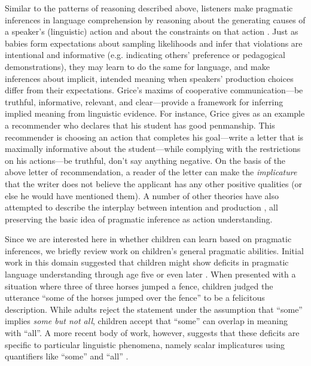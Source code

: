 \documentclass[man]{apa2}
\begin{document}

Similar to the patterns of reasoning described above, listeners make pragmatic inferences in language comprehension by reasoning about the generating causes of a speaker's (linguistic) action and about the constraints on that action \cite{shafto2012}. Just as babies form expectations about sampling likelihoods and infer that violations are intentional and informative (e.g. indicating others' preference or pedagogical demonstrations), they may learn to do the same for language, and make inferences about implicit, intended meaning when speakers' production choices differ from their expectations. Grice's \citeyear{grice1975} maxims of cooperative communication---be truthful, informative, relevant, and clear---provide a framework for inferring implied meaning from linguistic evidence. For instance, Grice gives as an example a recommender who declares that his student has good penmanship. This recommender is choosing an action that completes his goal---write a letter that is maximally informative about the student---while complying with the restrictions on his actions---be truthful, don't say anything negative. On the basis of the above letter of recommendation, a reader of the letter can make the \emph{implicature} that the writer does not believe the applicant has any other positive qualities (or else he would have mentioned them). A number of other theories have also attempted to describe the interplay between intention and production \cite{horn1984,sperber1986,clark1996,levinson2000}, all preserving the basic idea of pragmatic inference as action understanding. 

Since we are interested here in whether children can learn based on pragmatic inferences, we briefly review work on children's general pragmatic abilities. Initial work in this domain suggested that children might show deficits in pragmatic language understanding through age five or even later \cite{noveck2000,papafragou2003}. When presented with a situation where three of three horses jumped a fence, children judged the utterance ``some of the horses jumped over the fence'' to be a felicitous description. While adults reject the statement under the assumption that ``some'' implies \emph{some but not all}, children accept that ``some'' can overlap in meaning with ``all''.  A more recent body of work, however, suggests that these deficits are specific to particular linguistic phenomena, namely scalar implicatures using quantifiers like ``some'' and ``all'' \cite{barner2011,katsos2011}.
\end{document}
